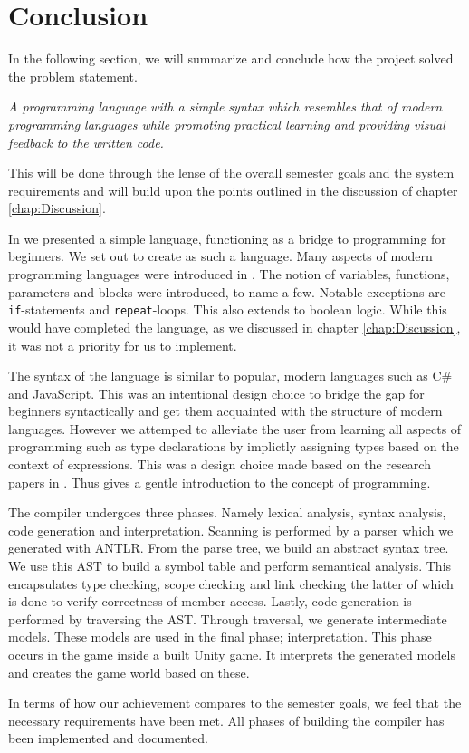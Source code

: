 \chapter{Conclusion}\label{chap:conclusion}

In the following section, we will summarize and conclude how the project solved the problem statement.

\vspace{5mm}
\textit{A programming language with a simple syntax which resembles that of modern programming languages while promoting practical learning and providing visual feedback to the written code.}
\vspace{5mm}

This will be done through the lense of the overall semester goals and the system requirements and will build upon the points outlined in the discussion of chapter \ref{chap:Discussion}.

In  we presented a simple language, functioning as a bridge to programming for beginners. We set out to create \dazel{} as such a language.
Many aspects of modern programming languages were introduced in \dazel{}. The notion of variables, functions, parameters and blocks were introduced, to name a few. Notable exceptions are \texttt{if}-statements and \texttt{repeat}-loops. This also extends to boolean logic. While this would have completed the language, as we discussed in chapter \ref{chap:Discussion}, it was not a priority for us to implement. 

The syntax of the language is similar to popular, modern languages such as C\# and JavaScript.
This was an intentional design choice to bridge the gap for beginners syntactically and get them acquainted with the structure of modern languages. 
However we attemped to alleviate the user from learning all aspects of programming such as type declarations by implictly assigning types based on the context of expressions. 
This was a design choice made based on the research papers in . 
Thus \dazel{} gives a gentle introduction to the concept of programming.

The \dazel{} compiler undergoes three phases. Namely lexical analysis, syntax analysis, code generation and interpretation. Scanning is performed by a parser which we generated with ANTLR. From the parse tree, we build an abstract syntax tree. We use this AST to build a symbol table and perform semantical analysis. This encapsulates type checking, scope checking and link checking the latter of which is done to verify correctness of member access. Lastly, code generation is performed by traversing the AST. Through traversal, we generate intermediate models. These models are used in the final phase; interpretation. This phase occurs in the \dazel{} game inside a built Unity game. It interprets the generated models and creates the game world based on these.

In terms of how our achievement compares to the semester goals, we feel that the necessary requirements have been met. All phases of building the compiler has been implemented and documented.